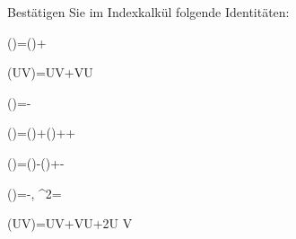 \begin{atiTask}[
  title = Vektoroperatoridentitäten I
]
Bestätigen Sie im Indexkalkül folgende Identitäten:
\begin{atiSubequations}
\item{\curl (\lambda {})=(\gradient \lambda)\times {}+\lambda \curl {}}
%
\item{\gradient(UV)=U\gradient V+V\gradient U}
%
\item{\divergence (\times{})=\curl {}-\curl {}}
%
\item{\gradient()=(\gradient)+(\gradient)+\times \curl {}+\times \curl {}}
%
\item{\curl (\times {})=(\gradient )-(\gradient)+\divergence {}-\divergence {}}
%
\item{(\gradient )=-\times \curl {}, \quad {}\quad {}^2=}
\item{\Delta (UV)=U\Delta V+V\Delta U+2\gradient U \cdot \gradient V}
\end{atiSubequations}

\end{atiTask}